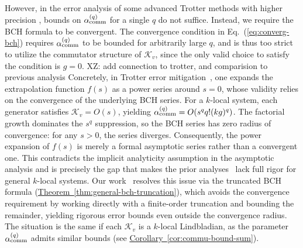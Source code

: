 \documentclass[11pt]{article}
\newcommand{\eq}[1]{(\ref{eq:#1})}
\newcommand{\thm}[1]{\hyperref[thm:#1]{Theorem~\ref*{thm:#1}}}
\newcommand{\cor}[1]{\hyperref[cor:#1]{Corollary~\ref*{cor:#1}}}
\newcommand{\mc}{\mathcal}
\newcommand{\xz}[1]{{\color{cyan} XZ: #1}}
\begin{document}
However, in the error analysis of some advanced Trotter methods with higher precision \cite{aftab2024multi, watson2025exponentially}, bounds on $\alpha_{\rm comm}^{(q)}$ for a single $q$ do not suffice. Instead, we require the BCH formula to be convergent. The convergence condition in Eq.~\eq{converg-bch} requires $\alpha_{\rm comm}^{(q)}$ to be bounded for arbitrarily large $q$, and is thus too strict to utilize the commutator structure of $\mc K_v$, since the only valid choice to satisfy the condition is $g = 0$. \xz{add connection to trotter, and comparision to previous analysis} Concretely, in Trotter error mitigation~\cite{watson2025exponentially}, one expands the extrapolation function $f(s)$ as a power series around $s=0$, whose validity relies on the convergence of the underlying BCH series. For a $k$-local system, each generator satisfies $\mc K_v = O(s)$, yielding $\alpha_{\rm comm}^{(q)} = O(s^q q! (kg)^q)$. The factorial growth dominates the $s^q$ suppression, so the BCH series has zero radius of convergence: for any $s>0$, the series diverges. Consequently, the power expansion of $f(s)$ is merely a formal asymptotic series rather than a convergent one. This contradicts the implicit analyticity assumption in the asymptotic analysis and is precisely the gap that makes the prior analyses~\cite{aftab2024multi, watson2025exponentially} lack full rigor for general $k$-local systems. Our work~\cite{wang2026lindbladiansimulationcommutatorbounds} resolves this issue via the truncated BCH formula (\thm{general-bch-truncation}), which avoids the convergence requirement by working directly with a finite-order truncation and bounding the remainder, yielding rigorous error bounds even outside the convergence radius. The situation is the same if each $\mc K_v$ is a $k$-local Lindbladian, as the parameter $\alpha_{\rm comm}^{(q)}$ admits similar bounds (see \cor{commu-bound-sum}). 
\end{document}
